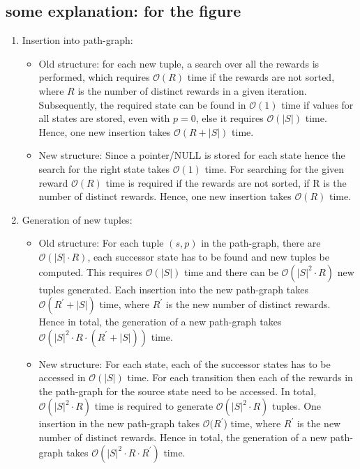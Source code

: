 \documentclass[a4paper,12pt]{article}
\begin{document}
\subsection{some explanation: for the figure}
\begin{enumerate}
	\item Insertion into path-graph:
	\begin{itemize}
	\item Old structure: for each new tuple, a search over all the rewards is performed, which requires $\mathcal{O}(R)$ time if the rewards are not sorted, where $R$ is the number of distinct rewards in a given iteration. Subsequently, the required state can be found in $\mathcal{O}(1)$ time if values for all states are stored, even with $p=0$, else it requires $\mathcal{O}(|S|)$ time. Hence, one new insertion takes $\mathcal{O}(R+|S|)$ time.
	\item New structure: Since a pointer/NULL is stored for each state hence the search for the right state takes $\mathcal{O}(1)$ time. For searching for the given reward $\mathcal{O}(R)$ time is required if the rewards are not sorted, if R is the number of distinct rewards. Hence, one new insertion takes $\mathcal{O}(R)$ time.
	\end{itemize}
	\item Generation of new tuples:
	\begin{itemize}
	\item Old structure: For each tuple $(s,p)$ in the path-graph, there are $\mathcal{O}(|S|\cdot R)$, each successor state has to be found and new tuples be computed. This requires $\mathcal{O}(|S|)$ time and there can be $\mathcal{O}(|S|^2\cdot R)$ new tuples generated. Each insertion into the new path-graph takes $\mathcal{O}(R^{\prime}+|S|)$ time, where $R^{\prime}$ is the new number of distinct rewards. Hence in total, the generation of a new path-graph takes $\mathcal{O}(|S|^2\cdot R\cdot (R^{\prime}+|S|))$ time.
	\item New structure: For each state, each of the successor states has to be accessed in $\mathcal{O}(|S|)$ time. For each transition then each of the rewards in the path-graph for the source state need to be accessed. In total, $\mathcal{O}(|S|^2\cdot R)$ time is required to generate $\mathcal{O}(|S|^2\cdot R)$ tuples. One insertion in the new path-graph takes $\mathcal{O}(R^{\prime}$) time, where $R^{\prime}$ is the new number of distinct rewards.  Hence in total, the generation of a new path-graph takes $\mathcal{O}(|S|^2\cdot R\cdot R^{\prime})$ time.
	\end{itemize}

\end{enumerate}
\end{document}
